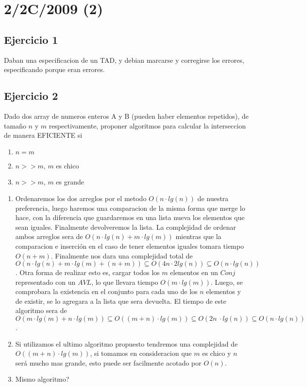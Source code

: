 \documentclass[10pt, a4paper]{article}
\begin{document}
\newpage
\section{2/2C/2009 (2)}

\subsection*{Ejercicio 1}

Daban una especificacion de un TAD, y debian marcarse y corregirse los errores, especificando porque eran errores.

\subsection*{Ejercicio 2}

Dado dos array de numeros enteros A y B (pueden haber elementos repetidos), de tama\~no $n$ y $m$ respectivamente, proponer algoritmos para calcular la interseccion de manera EFICIENTE si

\begin{enumerate}
 \item $n = m$
 \item $n >> m$, $m$ es chico
 \item $n >> m$, $m$ es grande
\end{enumerate}

\begin{enumerate}
 \item Ordenaremos los dos arreglos por el metodo $O(n\cdot lg(n))$ de nuestra preferencia, luego haremos una comparacion de la misma forma que merge lo hace, con la diferencia que guardaremos en una lista nueva los elementos que sean iguales. Finalmente devolveremos la lista. La complejidad de ordenar ambos arreglos sera de $O(n\cdot lg(n) + m \cdot lg(m))$ mientras que la comparacion e inserci\'on en el caso de tener elementos iguales tomara tiempo $O(n+m)$. Finalmente nos dara una complejidad total de $O(n\cdot lg(n) + m \cdot lg(m) + (n+m)) \subseteq O(4n \cdot 2lg(n)) \subseteq O(n \cdot lg(n))$. Otra forma de realizar esto es, cargar todos los $m$ elementos en un $Conj$ representado con un $AVL$, lo que llevara tiempo $O(m \cdot lg(m))$. Luego, se comprobara la existencia en el conjunto para cada uno de los $n$ elementos y de existir, se lo agregara a la lista que sera devuelta. El tiempo de este algoritmo sera de $O(m\cdot lg(m) + n \cdot lg(m)) \subseteq O((m+n) \cdot lg(m)) \subseteq O(2n \
\cdot lg(n)) \subseteq O(n \cdot lg(n))$.
 \item Si utilizamos el ultimo algoritmo propuesto tendremos una complejidad de $O((m+n) \cdot lg(m))$, si tomamos en consideracion que $m$ es chico y $n$ ser\'a mucho mas grande, esto puede ser facilmente acotado por $O(n)$. 

 \item {\color{red}Mismo algoritmo?}
\end{enumerate}
\end{document}
